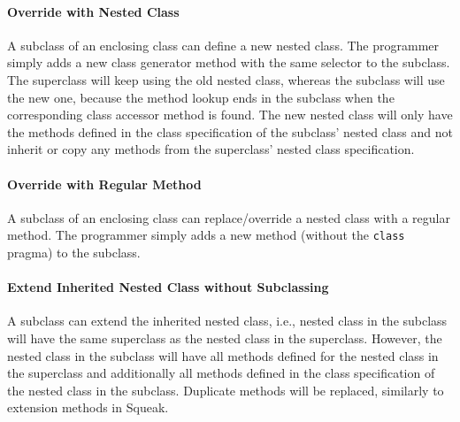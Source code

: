 \paragraph{Override with Nested Class}
A subclass of an enclosing class can define a new nested class. The programmer simply adds a new class generator method with the same selector to the subclass. The superclass will keep using the old nested class, whereas the subclass will use the new one, because the method lookup ends in the subclass when the corresponding class accessor method is found. The new nested class will only have the methods defined in the class specification of the subclass' nested class and not inherit or copy any methods from the superclass' nested class specification.

\paragraph{Override with Regular Method}
A subclass of an enclosing class can replace/override a nested class with a regular method. The programmer simply adds a new method (without the \texttt{class} pragma) to the subclass.

\paragraph{Extend Inherited Nested Class without Subclassing}
A subclass can extend the inherited nested class, i.e., nested class in the subclass will have the same superclass as the nested class in the superclass. However, the nested class in the subclass will have all methods defined for the nested class in the superclass and additionally all methods defined in the class specification of the nested class in the subclass. Duplicate methods will be replaced, similarly to extension methods in Squeak.

